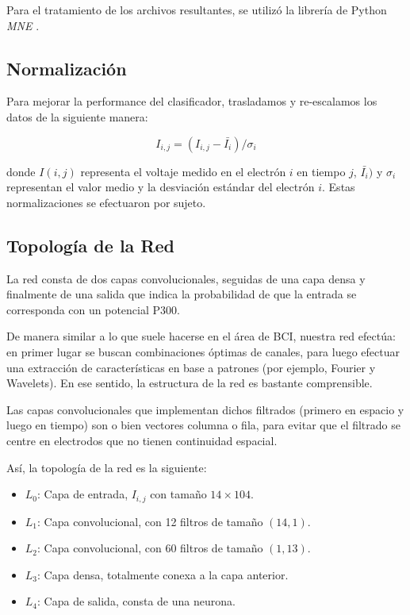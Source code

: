 Para el tratamiento de los archivos resultantes, se utilizó la librería de Python \emph{MNE} \cite{gramfort2014mne}.


\subsection{Normalización}

Para mejorar la performance del clasificador, trasladamos y re-escalamos los datos de la siguiente manera:

\begin{equation*}
    I_{i, j} = (I_{i, j} - \bar{I_i}) / \sigma_i
\end{equation*}
    
donde $I(i, j)$ representa el voltaje medido en el electrón $i$ en tiempo $j$, $ \bar{I_i})$ y $\sigma_i$ representan el valor medio y la desviación estándar del electrón $i$. Estas normalizaciones se efectuaron por sujeto. 


\subsection{Topología de la Red}

La red consta de dos capas convolucionales, seguidas de una capa densa y finalmente de una salida que indica la probabilidad de que la entrada se corresponda con un potencial P300. 

De manera similar a lo que suele hacerse en el área de BCI, nuestra red efectúa: en primer lugar se buscan combinaciones óptimas de canales, para luego efectuar una extracción de características en base a patrones (por ejemplo, Fourier y Wavelets). En ese sentido, la estructura de la red es bastante comprensible.

Las capas convolucionales que implementan dichos filtrados (primero en espacio y luego en tiempo) son o bien vectores columna o fila, para evitar que el filtrado se centre en electrodos que no tienen continuidad espacial. 

Así, la topología de la red es la siguiente:

\begin{itemize}
    \item $L_0$: Capa de entrada, $I_{i,j}$ con tamaño $14 \times 104$.
    \item $L_1$: Capa convolucional, con 12 filtros de tamaño $(14, 1)$. \item $L_2$: Capa convolucional, con 60 filtros de tamaño $(1, 13)$.
    \item $L_3$: Capa densa, totalmente conexa a la capa anterior.
    \item $L_4$: Capa de salida, consta de una neurona.
\end{itemize}

